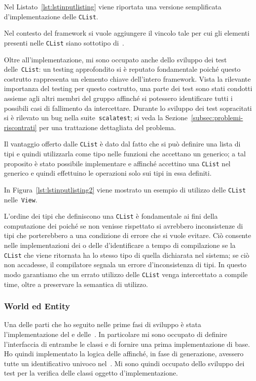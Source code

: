 Nel Listato~\ref{lst:lstinputlisting} viene riportata una versione semplificata d'implementazione delle \texttt{CList}.


Nel contesto del framework si vuole aggiungere il vincolo tale per cui gli elementi presenti nelle \texttt{CList} siano
sottotipo di~\Component.

Oltre all'implementazione, mi sono occupato anche dello sviluppo dei test delle~\texttt{CList}: un testing approfondito
si è reputato fondamentale poiché questo costrutto rappresenta un elemento chiave dell'intero framework.
Vista la rilevante importanza del testing per questo costrutto, una parte dei test sono stati condotti assieme agli
altri membri del gruppo affinché si potessero identificare tutti i possibili casi di fallimento da intercettare.
Durante lo sviluppo dei test sopracitati si è rilevato un bug nella suite~\texttt{scalatest}; si veda la
Sezione~\ref{subsec:problemi-riscontrati} per una trattazione dettagliata del problema.

Il vantaggio offerto dalle \texttt{CList} è dato dal fatto che si può definire una lista di tipi e quindi utilizzarla
come tipo nelle funzioni che accettano un generico;
a tal proposito è stato possibile implementare \System e \View affinché accettino una \texttt{CList} nel
generico e quindi effettuino le operazioni solo sui tipi in essa definiti.

In Figura~\ref{lst:lstinputlisting2} viene mostrato un esempio di utilizzo delle \texttt{CList} nelle~\texttt{View}.


L'ordine dei tipi che definiscono una \texttt{CList} è fondamentale ai fini della computazione dei \System poiché se non
venisse rispettato si avrebbero inconsistenze di tipi che porterebbero a una condizione di errore che si vuole evitare.
Ciò consente nelle implementazioni dei \System o delle \View d'identificare a tempo di compilazione se la
\texttt{CList} che viene ritornata ha lo stesso tipo di quella dichiarata nel sistema;
se ciò non accadesse, il compilatore segnala un errore d'inconsistenza di tipi.
In questo modo garantiamo che un errato utilizzo delle \texttt{CList} venga intercettato a compile time, oltre a
preservare la semantica di utilizzo.

\subsubsection{World ed Entity}
Una delle parti che ho seguito nelle prime fasi di sviluppo è stata l'implementazione del \World e delle~\Entity.
In particolare mi sono occupato di definire l'interfaccia di entrambe le classi e di fornire una prima implementazione
di base.
Ho quindi implementato la logica delle \Entity affinché, in fase di generazione, avessero tutte un identificativo
univoco nel~\World.
Mi sono quindi occupato dello sviluppo dei test per la verifica delle classi oggetto d'implementazione.

